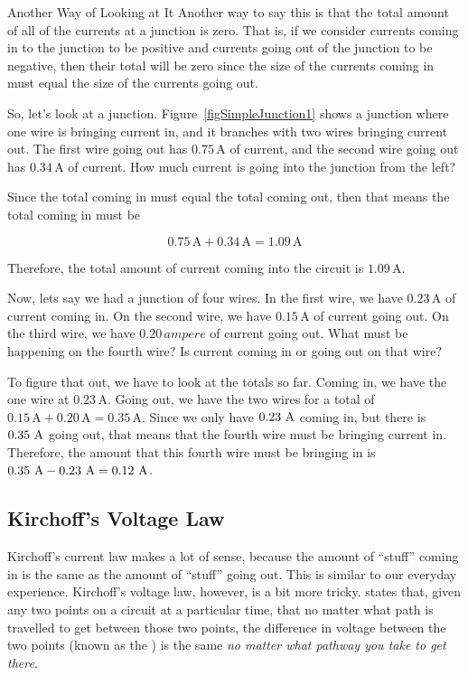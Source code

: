 \begin{advsidebar}{Another Way of Looking at It}
Another way to say this is that the total amount of all of the currents at a junction is zero.
That is, if we consider currents coming in to the junction to be positive and currents going out of the junction to be negative, then their total will be zero since the size of the currents coming in must equal the size of the currents going out.
\end{advsidebar}

So, let's look at a junction.
Figure~\ref{figSimpleJunction1} shows a junction where one wire is bringing current in, and it branches with two wires bringing current out.  
The first wire going out has $0.75\,\si{\ampere}$ of current, and the second wire going out has $0.34\,\si{\ampere}$ of current.
How much current is going into the junction from the left?


Since the total coming in must equal the total coming out, then that means the total coming in must be 

$$0.75\,\si{\ampere} + 0.34\,\si{\ampere} = 1.09\,\si{\ampere}$$

Therefore, the total amount of current coming into the circuit is $1.09\,\si{\ampere}$.

Now, lets say we had a junction of four wires.  
In the first wire, we have $0.23\,\si{\ampere}$ of current coming in.
On the second wire, we have $0.15\,\si{\ampere}$ of current going out.
On the third wire, we have $0.20\,\si{ampere}$ of current going out.
What must be happening on the fourth wire?
Is current coming in or going out on that wire?

To figure that out, we have to look at the totals so far.
Coming in, we have the one wire at $0.23\,\si{\ampere}$.
Going out, we have the two wires for a total of $0.15\,\si{\ampere} + 0.20\,\si{\ampere} = 0.35\,\si{\ampere}$.
Since we only have $0.23\,\,\si{\ampere}$ coming in, but there is $0.35\,\,\si{\ampere}$ going out, that means that the fourth wire must be bringing current in.
Therefore, the amount that this fourth wire must be bringing in is $0.35\,\,\si{\ampere} - 0.23\,\,\si{\ampere} = 0.12\,\,\si{\ampere}$.

\subsection{Kirchoff's Voltage Law}

Kirchoff's current law makes a lot of sense, because the amount of ``stuff'' coming in is the same as the amount of ``stuff'' going out.
This is similar to our everyday experience.
Kirchoff's voltage law, however, is a bit more tricky.
 states that, given any two points on a circuit at a particular time, that no matter what path is travelled to get between those two points, the difference in voltage between the two points (known as the ) is the same \emph{no matter what pathway you take to get there}.

